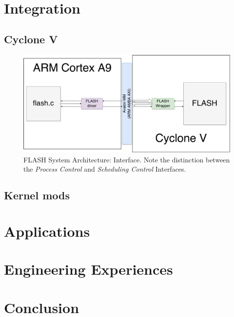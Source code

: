 \documentclass{sig-alternate-10pt}
\begin{document}
\section{Integration}
\subsection{Cyclone V}
\begin{figure}
	\begin{center}
		\includegraphics[width=0.9\linewidth]{fig/sockit-architecture.png}
		\caption{
			FLASH System Architecture: Interface.  Note the distinction between
			the \emph{Process Control} and \emph{Scheduling Control} Interfaces.
		}
		\label{fig:sockit_overview}
	\end{center}
\end{figure}


\subsection{Kernel mods}
\lipsum[1-3]


\section{Applications}
\lipsum[1-3]


\section{Engineering Experiences}
\lipsum[1-3]


\section{Conclusion}
\lipsum[1]

\nocite{*}
{
	
	
}
\end{document}
